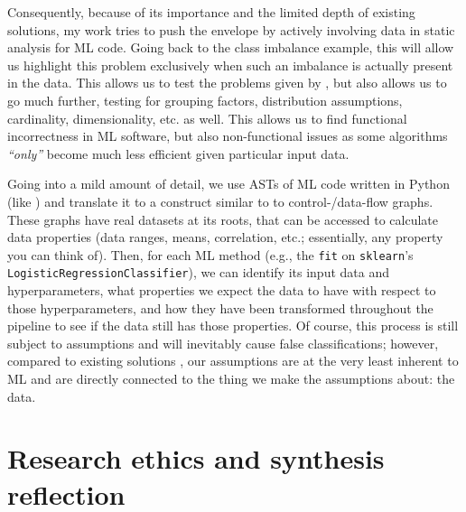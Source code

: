     Consequently, because of its importance and the limited depth of existing solutions, my work \citep{meijer_contract_2024} tries to push the envelope by actively involving data in static analysis for ML code.
    Going back to the class imbalance example, this will allow us highlight this problem exclusively when such an imbalance is actually present in the data.
    This allows us to test the problems given by \citet{recupito2024unmasking}, but also allows us to go much further, testing for grouping factors, distribution assumptions, cardinality, dimensionality, etc. as well.
    This allows us to find functional incorrectness in ML software, but also non-functional issues as some algorithms \textit{``only''} become much less efficient given particular input data.

    Going into a mild amount of detail, we use ASTs of ML code written in Python (like \citet{shivashankar2025mlscent}) and translate it to a construct similar to to control-/data-flow graphs.
    These graphs have real datasets at its roots, that can be accessed to calculate data properties (data ranges, means, correlation, etc.; essentially, any property you can think of).
    Then, for each ML method (e.g., the \texttt{fit} on \texttt{sklearn}'s \texttt{LogisticRegressionClassifier}), we can identify its input data and hyperparameters, what properties we expect the data to have with respect to those hyperparameters, and how they have been transformed throughout the pipeline to see if the data still has those properties.
    Of course, this process is still subject to assumptions and will inevitably cause false classifications; however, compared to existing solutions \citep{shivashankar2025mlscent, quaranta2024pynblint}, our assumptions are at the very least inherent to ML and are directly connected to the thing we make the assumptions about: the data.
    

\section*{Research ethics and synthesis reflection}


